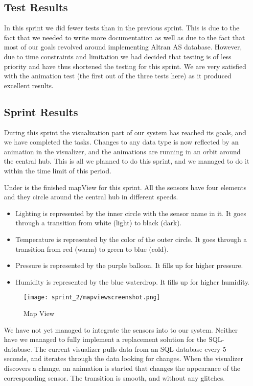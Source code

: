 \documentclass[../document]{subfiles}
\begin{document}
\subsection{Test Results}
In this sprint we did fewer tests than in the previous sprint. This is due to the fact that we needed to write more documentation as well as due to the fact that most of our goals revolved around implementing Altran AS database. However, due to time constraints and limitation we had decided that testing is of less priority and have thus shortened the testing for this sprint. We are very satisfied with the animation test (the first out of the three tests here) as it produced excellent results.

\subsection{Sprint Results}
During this sprint the visualization part of our system has reached its goals, and we have completed the tasks. Changes to any data type is now reflected by an animation in the visualizer, and the animations are running in an orbit around the central hub. This is all we planned to do this sprint, and we managed to do it within the time limit of this period. 

Under is the finished mapView for this sprint. All the sensors have four elements and they circle around the central hub in different speeds.

\begin{itemize}
\item
Lighting is represented by the inner circle with the sensor name in it. It goes through a transition from white (light) to black (dark).
\item
Temperature is represented by the color of the outer circle. It goes through a transition from red (warm) to green to blue (cold).
\item
Pressure is represented by the purple balloon. It fills up for higher pressure.
\item
Humidity is represented by the blue waterdrop. It fills up for higher humidity.
\end{itemize}

\begin{figure}[H]
	\centering
	\texttt{[image: sprint\_2/mapviewscreenshot.png]}
	\caption{Map View}
\end{figure}

We have not yet managed to integrate the sensors into to our system. Neither have we managed to fully implement a replacement solution for the SQL-database. The current visualizer pulls data from an SQL-database every 5 seconds, and iterates through the data looking for changes. When the visualizer discovers a change, an animation is started that changes the appearance of the corresponding sensor. The transition is smooth, and without any glitches.
\end{document}
